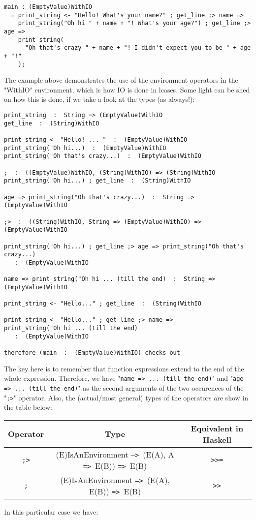 \documentclass{article}
\def\H{Haskell}
\def\ra{\texttt{=>}\ }
\def\Ra{\texttt{-->}\ }
\begin{document}
\begin{verbatim}
main : (EmptyValue)WithIO
  = print_string <- "Hello! What's your name?" ; get_line ;> name =>
    print_string("Oh hi " + name + "! What's your age?") ; get_line ;> age =>
    print_string(
      "Oh that's crazy " + name + "! I didn't expect you to be " + age + "!"
    );
\end{verbatim}
The example above demonstrates the use of the environment operators in the 
"WithIO" environment, which is how IO is done in lcases. Some light can be shed
on how this is done, if we take a look at the types (as always!):
\begin{verbatim}
print_string  :  String => (EmptyValue)WithIO
get_line  :  (String)WithIO

print_string <- "Hello! ... "  :  (EmptyValue)WithIO
print_string("Oh hi...)  :  (EmptyValue)WithIO
print_string("Oh that's crazy...)  :  (EmptyValue)WithIO

;  :  ((EmptyValue)WithIO, (String)WithIO) => (String)WithIO 
print_string("Oh hi...) ; get_line  :  (String)WithIO

age => print_string("Oh that's crazy...)  :  String => (EmptyValue)WithIO

;>  :  ((String)WithIO, String => (EmptyValue)WithIO) => (EmptyValue)WithIO 

print_string("Oh hi...) ; get_line ;> age => print_string("Oh that's crazy...)
   :  (EmptyValue)WithIO

name => print_string("Oh hi ... (till the end)  :  String => (EmptyValue)WithIO

print_string <- "Hello..." ; get_line  :  (String)WithIO

print_string <- "Hello..." ; get_line ;> name =>
print_string("Oh hi ... (till the end)
   :  (EmptyValue)WithIO

therefore (main  :  (EmptyValue)WithIO) checks out
\end{verbatim}
The key here is to remember that function expressions extend to the end of the
whole expression. Therefore, we have "\texttt{name => ... (till the end)}" and
"\texttt{age => ... (till the end)}" as the second arguments of the two
occurences of the "\texttt{;>}" operator. Also, the (actual/most general) types
of the operators are show in the table below:

\begin{center}
\begin{tabular}{ |c|c|c| } 
\hline
Operator & Type & Equivalent in \H \\ 
\hline
\hline
\texttt{;>} & (E)IsAnEnvironment \Ra (E(A), A \ra E(B)) \ra E(B) & \texttt{>>=} \\
\hline
\texttt{;} & (E)IsAnEnvironment \Ra (E(A), E(B)) \ra E(B) & \texttt{>>} \\
\hline
\end{tabular}
\end{center}
In this particular case we have:
\end{document}
